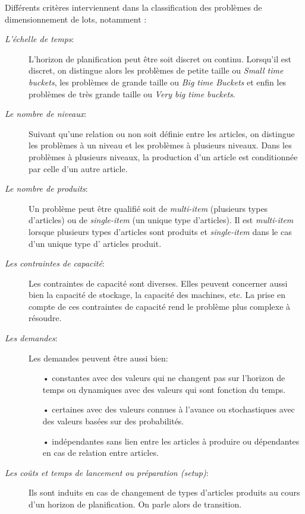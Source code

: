 Différents critères interviennent dans la classification des problèmes de dimensionnement de lots, notamment : 
\begin{description}
	\item[\textsl{L'échelle de temps}:] L'horizon de planification peut être soit discret ou continu. Lorsqu'il est discret, on distingue alors les problèmes de petite taille ou \emph{Small time buckets}, les problèmes de grande taille ou \emph{Big time Buckets} et enfin les problèmes de très grande taille ou \emph{Very big time buckets}.

	\item[\textsl{Le nombre de niveaux}:] Suivant qu'une relation ou non soit définie entre les articles, on distingue les problèmes à un niveau et les problèmes à plusieurs niveaux. Dans les problèmes à plusieurs niveaux, la production d'un article est conditionnée par celle d'un autre article. 

	\item[\textsl{Le nombre de produits}:] Un problème peut être qualifié soit de \emph{multi-item} (plusieurs types d'articles) ou de \emph{single-item} (un unique type d'articles). Il est \emph{multi-item} lorsque plusieurs types d'articles sont produits et \emph{single-item} dans le cas d'un unique type d' articles produit. 

	\item[\textsl{Les contraintes de capacité}:] Les contraintes de capacité sont diverses. Elles peuvent concerner aussi bien la capacité de stockage, la capacité des machines, etc. La prise en compte de ces contraintes de capacité rend le problème plus complexe à résoudre.

	\item[\textsl{Les demandes}:] Les demandes peuvent être aussi bien:
	\begin{itemize}
		\item[•] constantes avec des valeurs qui ne changent pas sur l'horizon de temps ou dynamiques avec  des valeurs qui sont fonction du temps.
		\item[•] certaines avec des valeurs connues à l'avance ou stochastiques avec des valeurs basées sur des probabilités.
		\item[•] indépendantes sans lien entre les articles à produire ou dépendantes en cas de relation entre articles.
	\end{itemize}

	\item[\textsl{Les coûts et temps de lancement ou préparation (setup)}:] Ils sont induits en cas de changement de types d'articles produits au cours d'un horizon de planification. On parle alors de transition.
	
\end{description}

